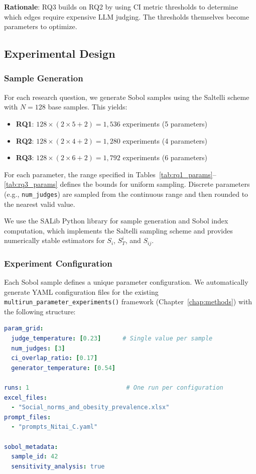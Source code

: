\textbf{Rationale}: RQ3 builds on RQ2 by using CI metric thresholds to determine which edges require expensive LLM judging. The thresholds themselves become parameters to optimize.

\subsection{Experimental Design}

\subsubsection{Sample Generation}

For each research question, we generate Sobol samples using the Saltelli scheme with $N = 128$ base samples. This yields:

\begin{itemize}
    \item \textbf{RQ1}: $128 \times (2 \times 5 + 2) = 1,536$ experiments (5 parameters)
    \item \textbf{RQ2}: $128 \times (2 \times 4 + 2) = 1,280$ experiments (4 parameters)
    \item \textbf{RQ3}: $128 \times (2 \times 6 + 2) = 1,792$ experiments (6 parameters)
\end{itemize}

For each parameter, the range specified in Tables~\ref{tab:rq1_params}--\ref{tab:rq3_params} defines the bounds for uniform sampling. Discrete parameters (e.g., \texttt{num\_judges}) are sampled from the continuous range and then rounded to the nearest valid value.

We use the SALib Python library \citep{herman2017salib} for sample generation and Sobol index computation, which implements the Saltelli sampling scheme and provides numerically stable estimators for $S_i$, $S_T^i$, and $S_{ij}$.

\subsubsection{Experiment Configuration}

Each Sobol sample defines a unique parameter configuration. We automatically generate YAML configuration files for the existing \texttt{multirun\_parameter\_experiments()} framework (Chapter~\ref{chap:methods}) with the following structure:

\begin{lstlisting}[language=yaml,caption={Generated Sobol configuration example},label={lst:sobol_config}]
param_grid:
  judge_temperature: [0.23]      # Single value per sample
  num_judges: [3]
  ci_overlap_ratio: [0.17]
  generator_temperature: [0.54]

runs: 1                           # One run per configuration
excel_files:
  - "Social_norms_and_obesity_prevalence.xlsx"
prompt_files:
  - "prompts_Nitai_C.yaml"

sobol_metadata:
  sample_id: 42
  sensitivity_analysis: true
\end{lstlisting}

